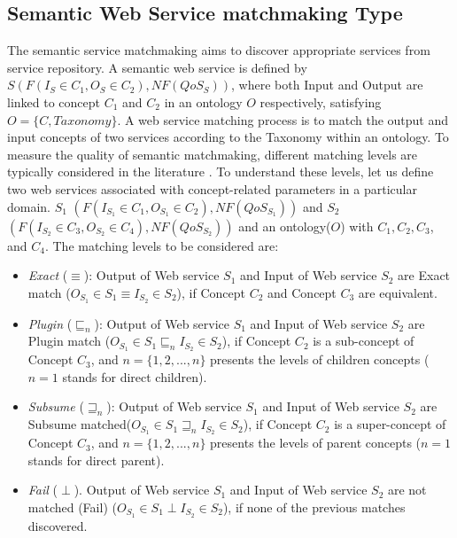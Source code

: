 \documentclass{llncs}
\begin{document}
\subsection{Semantic Web Service matchmaking Type}\label{semantic Web service Discovery}
The semantic service matchmaking aims to discover appropriate services from service repository. A semantic web service is defined by $S(F(I_{S}\in C_{1}, O_{S}\in C_{2}), NF(QoS_{S}))$, where both Input and Output are linked to concept $C_{1}$ and $C_{2}$ in an ontology $O$ respectively, satisfying $O=\{C, Taxonomy\}$. A web service matching process is to match the output and input concepts of two services according to the Taxonomy within an ontology. To measure the quality of semantic matchmaking, different matching levels are typically considered in the literature \cite{paolucci2002semantic}. To understand these levels, let us define two web services associated with concept-related parameters in a particular domain. $S_{1}$ $(F(I_{S_1}\in C_{1}, O_{S_1}\in C_{2}), NF(QoS_{S_1}))$ and  $S_{2}$ $(F(I_{S_2}\in C_{3}, O_{S_2}\in C_{4}), NF(QoS_{S_2}))$ and an ontology($O$) with $C_{1},C_{2},C_{3}$, and $C_{4}$. The matching levels to be considered are:

\begin{itemize}
\item \textit{Exact} ($\equiv$): Output of Web service $S_{1}$ and Input of Web service $S_{2}$ are Exact match ($ O_{S_1} \in S_{1} \equiv I_{S_2} \in S_{2}$), if  Concept $C_{2}$ and Concept $C_{3}$ are equivalent.
\item \textit{Plugin} ($\sqsubseteq_{n}$): Output of Web service $S_{1}$ and Input of Web service $S_{2}$ are Plugin match ($O_{S_1} \in S_{1} \sqsubseteq_{n} I_{S_2} \in S_{2}$), if  Concept $C_{2}$ is a sub-concept of Concept $C_{3}$, and $n = \{1,2,...,n \}$ presents the levels of children concepts ($n=1$ stands for direct children).
\item \textit{Subsume} ($\sqsupseteq_{n}$): Output of Web service $S_{1}$ and Input of Web service $S_{2}$ are Subsume matched($O_{S_1} \in S_{1} \sqsupseteq_{n} I_{S_2} \in S_{2}$), if  Concept $C_{2}$ is a super-concept of  Concept $C_{3}$, and $n = \{1,2,...,n \}$ presents the levels of parent concepts ($n=1$ stands for direct parent).
\item \textit{Fail} ($\perp$). Output of Web service $S_{1}$ and Input of Web service $S_{2}$ are not matched (Fail) ($O_{S_1} \in S_{1} \perp I_{S_2} \in S_{2}$), if none of the previous matches discovered.
\end{itemize}
\end{document}
